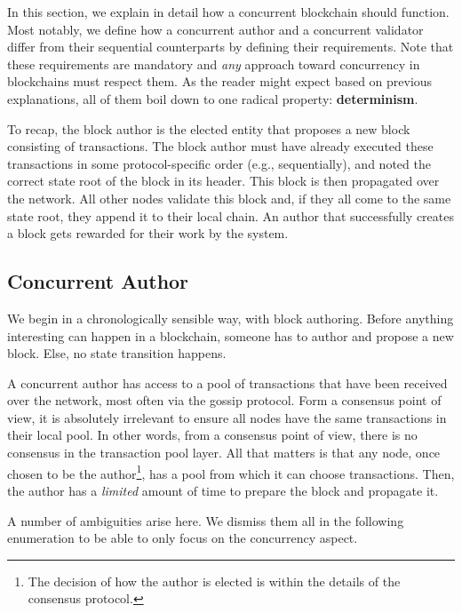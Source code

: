In this section, we explain in detail how a concurrent blockchain should function. Most notably, we
define how a concurrent author and a concurrent validator differ from their sequential counterparts
by defining their requirements. Note that these requirements are mandatory and \textit{any} approach
toward concurrency in blockchains must respect them. As the reader might expect based on previous
explanations, all of them boil down to one radical property: \textbf{determinism}.

To recap, the block author is the elected entity that proposes a new block consisting of
transactions. The block author must have already executed these transactions in some
protocol-specific order (e.g., sequentially), and noted the correct state root of the block in its
header. This block is then propagated over the network. All other nodes validate this block and, if
they all come to the same state root, they append it to their local chain. An author that
successfully creates a block gets rewarded for their work by the system.

\subsection{Concurrent Author}

We begin in a chronologically sensible way, with block authoring. Before anything interesting can
happen in a blockchain, someone has to author and propose a new block. Else, no state transition
happens.

A concurrent author has access to a pool of transactions that have been received over the network,
most often via the gossip protocol. Form a consensus point of view, it is absolutely irrelevant to
ensure all nodes have the same transactions in their local pool. In other words, from a consensus
point of view, there is no consensus in the transaction pool layer. All that matters is that any
node, once chosen to be the author\footnote{The decision of how the author is elected is within the
details of the consensus protocol.}, has a pool from which it can choose transactions. Then, the
author has a \textit{limited} amount of time to prepare the block and propagate it.

A number of ambiguities arise here. We dismiss them all in the following enumeration to be able to
only focus on the concurrency aspect.

